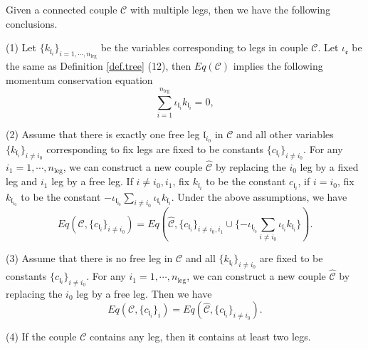 \begin{lem}\label{lem.freeleg} %
Given a connected couple $\mathcal{C}$ with multiple legs, then we have the following conclusions.

(1) Let $\{k_{\mathfrak{l}_i}\}_{i=1,\cdots,n_{\text{leg}}}$ be the variables corresponding to legs in couple $\mathcal{C}$. Let $\iota_{\mathfrak{e}}$ be the same as Definition \ref{def.tree} (12), then $Eq(\mathcal{C})$ implies the following momentum conservation equation
\begin{equation}\label{eq.momentumconservation}
 \sum_{i=1}^{n_{\text{leg}}} \iota_{\mathfrak{l}_i}k_{\mathfrak{l}_i}=0,
\end{equation}

(2) Assume that there is exactly one free leg $\mathfrak{l}_{i_0}$ in $\mathcal{C}$ and all other variables $\{k_{\mathfrak{l}_{i}}\}_{i\ne i_0}$ corresponding to fix legs are fixed to be constants $\{c_{\mathfrak{l}_{i}}\}_{i\ne i_0}$. For any $i_{1}=1,\cdots,n_{\text{leg}}$, we can construct a new couple $\widehat{\mathcal{C}}$ by replacing the $i_0$ leg by a fixed leg and $i_1$ leg by a free leg. If $i\ne i_0, i_1$, fix $k_{\mathfrak{l}_{i}}$ to be the constant $c_{\mathfrak{l}_{i}}$, if $i=i_0$, fix $k_{\mathfrak{l}_{i_0}}$ to be the constant $-\iota_{\mathfrak{l}_{i_0}}\sum_{i\ne i_0} \iota_{\mathfrak{l}_i}k_{\mathfrak{l}_i}$. Under the above assumptions, we have
\begin{equation}
 Eq(\mathcal{C}, \{c_{\mathfrak{l}_{i}}\}_{i\ne i_0})=Eq\left(\widehat{\mathcal{C}}, \{c_{\mathfrak{l}_{i}}\}_{i\ne i_0, i_1}\cup \{-\iota_{\mathfrak{l}_{i_0}}\sum_{i\ne i_0} \iota_{\mathfrak{l}_i}k_{\mathfrak{l}_i}\}\right).
\end{equation}

(3) Assume that there is no free leg in $\mathcal{C}$ and all $\{k_{\mathfrak{l}_{i}}\}_{i\ne i_0}$ are fixed to be constants $\{c_{\mathfrak{l}_{i}}\}_{i\ne i_0}$. For any $i_{1}=1,\cdots,n_{\text{leg}}$, we can construct a new couple $\widehat{\mathcal{C}}$ by replacing the $i_0$ leg by a free leg. Then we have
\begin{equation}
 Eq(\mathcal{C}, \{c_{\mathfrak{l}_{i}}\}_{i})=Eq(\widehat{\mathcal{C}}, \{c_{\mathfrak{l}_{i}}\}_{i\ne i_0}).
\end{equation}

(4) If the couple $\mathcal{C}$ contains any leg, then it contains at least two legs.

\end{lem}
